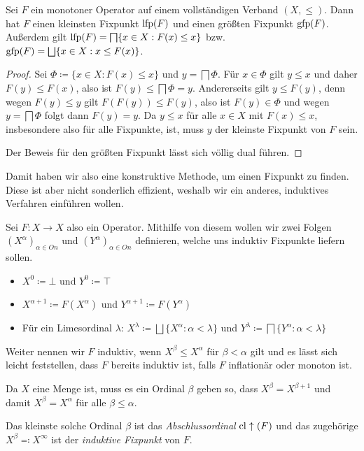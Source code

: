 \begin{satz}
	Sei $F$ ein monotoner Operator auf einem vollständigen Verband $(X,\leq)$. Dann hat $F$ einen kleinsten Fixpunkt $\operatorname{lfp}(F)$ und einen größten Fixpunkt $\operatorname{gfp}(F)$. Außerdem gilt $\operatorname{lfp}(F)=\bigsqcap\{x\in X : F(x)\leq x\}$ bzw. $\operatorname{gfp}(F)=\bigsqcup\{x\in X : x\leq F(x)\}$.
	\label{Knaster-Tarski}
\end{satz}
\begin{proof}
	Sei $\Phi\coloneqq \{x\in X : F(x)\leq x\}$ und $y=\bigsqcap\Phi$. Für $x\in\Phi$ gilt $y\leq x$ und daher $F(y)\leq F(x)$, also ist $F(y)\leq\bigsqcap \Phi = y$.
	Andererseits gilt $y\leq F(y)$, denn wegen $F(y)\leq y$ gilt $F(F(y))\leq F(y)$, also ist $F(y)\in \Phi$ und wegen $y=\bigsqcap\Phi$ folgt dann $F(y)=y$.
	Da $y\leq x$ für alle $x\in X$ mit $F(x)\leq x$, insbesondere also für alle Fixpunkte, ist, muss $y$ der kleinste Fixpunkt von $F$ sein.
	
	Der Beweis für den größten Fixpunkt lässt sich völlig dual führen.
\end{proof}

Damit haben wir also eine konstruktive Methode, um einen Fixpunkt zu finden. Diese ist aber nicht sonderlich effizient, weshalb wir ein anderes, induktives Verfahren einführen wollen.

Sei $F:X\to X$ also ein Operator. Mithilfe von diesem wollen wir zwei Folgen $(X^\alpha)_{\alpha\in On}$ und $(Y^\alpha)_{\alpha\in On}$ definieren, welche uns induktiv Fixpunkte liefern sollen.
\begin{itemize}
	\item $X^0\coloneqq\bot$ und $Y^0\coloneqq\top$
	\item $X^{\alpha+1}\coloneqq F(X^\alpha)$ und $Y^{\alpha+1}\coloneqq F(Y^\alpha)$
	\item Für ein Limesordinal $\lambda$: $X^\lambda \coloneqq \bigsqcup\{X^\alpha : \alpha<\lambda\}$ und 
	$Y^\lambda \coloneqq \bigsqcap\{Y^\alpha : \alpha < \lambda\}$
\end{itemize}

Weiter nennen wir $F$ induktiv, wenn $X^\beta \leq X^\alpha$ für $\beta<\alpha$ gilt und es lässt sich leicht feststellen, dass $F$ bereits induktiv ist, falls $F$ inflationär oder monoton ist.

\begin{definition}
	Da $X$ eine Menge ist, muss es ein Ordinal $\beta$ geben so, dass $X^\beta= X^{\beta+1}$ und damit $X^\beta=X^\alpha$ für alle $\beta \leq \alpha$. 
	
	Das kleinste solche Ordinal $\beta$ ist das \textit{Abschlussordinal} $\operatorname{cl}\uparrow(F)$ und das zugehörige $X^\beta \eqqcolon X^\infty$ ist der \textit{induktive Fixpunkt} von $F$.
\end{definition}

